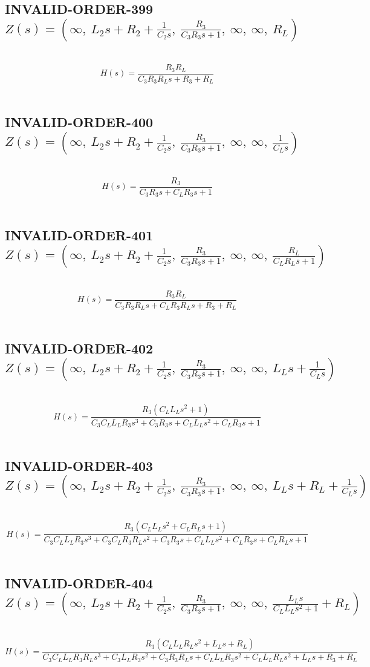 \documentclass{article}
\begin{document}
\subsection{INVALID-ORDER-399 $Z(s) = \left( \infty, \  L_{2} s + R_{2} + \frac{1}{C_{2} s}, \  \frac{R_{3}}{C_{3} R_{3} s + 1}, \  \infty, \  \infty, \  R_{L}\right)$ } \ 
\textbf{\[H(s) = \frac{R_{3} R_{L}}{C_{3} R_{3} R_{L} s + R_{3} + R_{L}}\] } \ 
\subsection{INVALID-ORDER-400 $Z(s) = \left( \infty, \  L_{2} s + R_{2} + \frac{1}{C_{2} s}, \  \frac{R_{3}}{C_{3} R_{3} s + 1}, \  \infty, \  \infty, \  \frac{1}{C_{L} s}\right)$ } \ 
\textbf{\[H(s) = \frac{R_{3}}{C_{3} R_{3} s + C_{L} R_{3} s + 1}\] } \ 
\subsection{INVALID-ORDER-401 $Z(s) = \left( \infty, \  L_{2} s + R_{2} + \frac{1}{C_{2} s}, \  \frac{R_{3}}{C_{3} R_{3} s + 1}, \  \infty, \  \infty, \  \frac{R_{L}}{C_{L} R_{L} s + 1}\right)$ } \ 
\textbf{\[H(s) = \frac{R_{3} R_{L}}{C_{3} R_{3} R_{L} s + C_{L} R_{3} R_{L} s + R_{3} + R_{L}}\] } \ 
\subsection{INVALID-ORDER-402 $Z(s) = \left( \infty, \  L_{2} s + R_{2} + \frac{1}{C_{2} s}, \  \frac{R_{3}}{C_{3} R_{3} s + 1}, \  \infty, \  \infty, \  L_{L} s + \frac{1}{C_{L} s}\right)$ } \ 
\textbf{\[H(s) = \frac{R_{3} \left(C_{L} L_{L} s^{2} + 1\right)}{C_{3} C_{L} L_{L} R_{3} s^{3} + C_{3} R_{3} s + C_{L} L_{L} s^{2} + C_{L} R_{3} s + 1}\] } \ 
\subsection{INVALID-ORDER-403 $Z(s) = \left( \infty, \  L_{2} s + R_{2} + \frac{1}{C_{2} s}, \  \frac{R_{3}}{C_{3} R_{3} s + 1}, \  \infty, \  \infty, \  L_{L} s + R_{L} + \frac{1}{C_{L} s}\right)$ } \ 
\textbf{\[H(s) = \frac{R_{3} \left(C_{L} L_{L} s^{2} + C_{L} R_{L} s + 1\right)}{C_{3} C_{L} L_{L} R_{3} s^{3} + C_{3} C_{L} R_{3} R_{L} s^{2} + C_{3} R_{3} s + C_{L} L_{L} s^{2} + C_{L} R_{3} s + C_{L} R_{L} s + 1}\] } \ 
\subsection{INVALID-ORDER-404 $Z(s) = \left( \infty, \  L_{2} s + R_{2} + \frac{1}{C_{2} s}, \  \frac{R_{3}}{C_{3} R_{3} s + 1}, \  \infty, \  \infty, \  \frac{L_{L} s}{C_{L} L_{L} s^{2} + 1} + R_{L}\right)$ } \ 
\textbf{\[H(s) = \frac{R_{3} \left(C_{L} L_{L} R_{L} s^{2} + L_{L} s + R_{L}\right)}{C_{3} C_{L} L_{L} R_{3} R_{L} s^{3} + C_{3} L_{L} R_{3} s^{2} + C_{3} R_{3} R_{L} s + C_{L} L_{L} R_{3} s^{2} + C_{L} L_{L} R_{L} s^{2} + L_{L} s + R_{3} + R_{L}}\] } \ 
\end{document}
